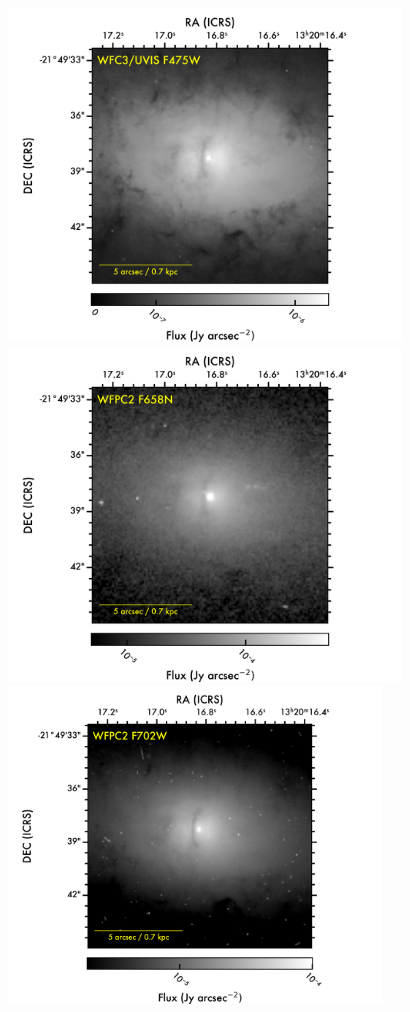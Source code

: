 \documentclass[modern]{CORE-AAS/aastex631}
\begin{document}
{\begin{figure}[]
\begin{center}
\includegraphics[trim={0 25 60 0}, clip, height=8.85cm]{FIGURES/NGC5084_F475W.png}
\includegraphics[trim={140 25 60 0}, clip, height=8.85cm]{FIGURES/NGC5084_F658N.png}
\includegraphics[trim={0 0 60 57}, clip, height=8.4cm]{FIGURES/NGC5084_F702W.png}

\end{center}
\end{figure}}
\end{document}
